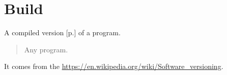 \section{Build}
\label{sec:Build}

 A compiled version [p.\pageref{sec:Version}] of a program. 

\begin{quote}
Any program.
\end{quote} 

It comes from the \url{https://en.wikipedia.org/wiki/Software_versioning}.
